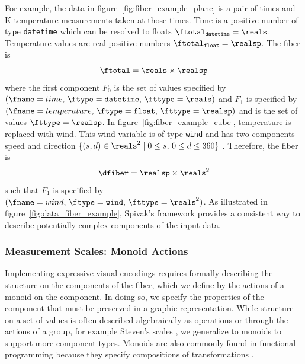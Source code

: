 \documentclass[../main.tex]{subfiles}
\begin{document}
For example, the data in figure~\ref{fig:fiber_example_plane} is a pair of times and \textdegree K temperature measurements taken at those times. Time is a positive number of type \texttt{datetime} which can be resolved to floats $\ftotal_{\texttt{datetime}}= \reals$. Temperature values are real positive numbers $\ftotal_{\texttt{float}} = \realsp$. The fiber is 
\begin{equation}
    \ftotal =  \reals \times \realsp 
\end{equation} 
where the first component $F_0$ is the set of values specified by $(\fname=time,\, \ftype=\texttt{datetime},\, \fttype=\reals)$ and $F_1$ is specified by $(\fname=temperature,\, \ftype=\texttt{float},\, \fttype=\realsp)$ and is the set of values $\fttype=\realsp$. In figure~\ref{fig:fiber_example_cube}, temperature is replaced with wind. This wind variable is of type \texttt{wind} and has two components speed and direction $\{(s,d) \in \reals^{2} \mid  0\leq s,\, 0 \leq d \leq 360\}$ . Therefore, the fiber is 
\begin{equation}
    \dfiber = \realsp \times \reals^{2}
\end{equation} 
such that $F_1$ is specified by $(\fname = wind,\, \ftype = \texttt{wind},\, \fttype=\reals^{2})$.  As illustrated in figure~\ref{fig:data_fiber_example}, Spivak's framework provides a consistent way to describe potentially complex components of the input data. 

\subsubsection{Measurement Scales: Monoid Actions}
\label{sec:data_monoid}
Implementing expressive visual encodings requires formally describing the structure on the components of the fiber, which we define by the actions of a monoid on the component. In doing so, we specify the properties of the component that must be preserved in a graphic representation. While structure on a set of values is often described algebraically as operations or through the actions of a group, for example Steven's scales \cite{stevensTheoryScalesMeasurement1946}, we generalize to monoids to support more component types. Monoids are also commonly found in functional programming because they specify compositions of transformations \cite{yorgeyMonoidsThemeVariations, stievenMonadJustMonoid2020}. 
\end{document}
